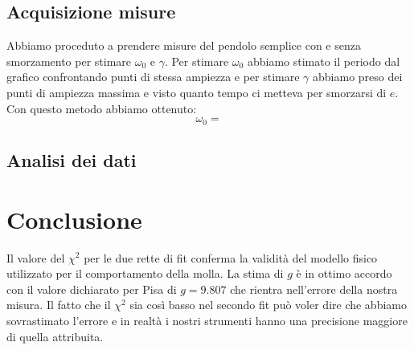 \documentclass[a4paper,10pt]{article}
\begin{document}
\subsection{Acquisizione misure}
Abbiamo proceduto a prendere misure del pendolo semplice con e senza smorzamento per stimare $\omega_0$ e $\gamma$.
Per stimare $\omega_0$ abbiamo stimato il periodo dal grafico  confrontando punti di stessa ampiezza e per stimare $\gamma$ abbiamo preso dei punti di ampiezza massima e visto quanto tempo ci metteva per smorzarsi di $e$.
Con questo metodo abbiamo ottenuto:
\begin{equation}
\omega_0=
\end{equation}


\subsection{Analisi dei dati}



\section{Conclusione}
 Il valore del $\chi^2$ per le due rette di fit conferma  la validità del modello fisico utilizzato per il comportamento della molla. La stima di $g$ è in ottimo accordo con il valore dichiarato per Pisa di $g=9.807$ che rientra nell'errore della nostra misura. Il fatto che il $\chi^2$ sia così basso nel secondo fit può voler dire che abbiamo sovrastimato l'errore e in realtà i nostri strumenti hanno una precisione maggiore di quella attribuita.
\end{document}
